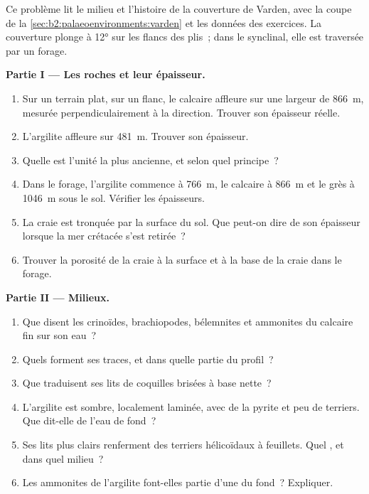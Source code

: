 \begin{problem}\label{pb:b2:palaeoenvironments:1}
Ce problème lit le milieu et l'histoire de la couverture de Varden, avec la coupe de la
\cref{sec:b2:palaeoenvironments:varden} et les données des exercices. La couverture plonge
à \ang{12} sur les flancs des plis~; dans le synclinal, elle est traversée par un forage.

\medskip\noindent\textbf{Partie I --- Les roches et leur épaisseur.}
\begin{enumerate}
\item Sur un terrain plat, sur un flanc, le calcaire affleure sur une largeur de
\qty{866}{m}, mesurée perpendiculairement à la direction. Trouver son épaisseur réelle.
\item L'argilite affleure sur \qty{481}{m}. Trouver son épaisseur.
\item Quelle est l'unité la plus ancienne, et selon quel principe~?
\item Dans le forage, l'argilite commence à \qty{766}{m}, le calcaire
à \qty{866}{m} et le grès à \qty{1046}{m} sous le sol. Vérifier les épaisseurs.
\item La craie est tronquée par la surface du sol. Que peut-on
dire de son épaisseur lorsque la mer crétacée s'est retirée~?
\item Trouver la porosité de la craie à la surface et à la base de la craie dans le forage.
\end{enumerate}

\medskip\noindent\textbf{Partie II --- Milieux.}
\begin{enumerate}[resume]
\item Que disent les crinoïdes, brachiopodes,
bélemnites et ammonites du calcaire fin sur son eau~?
\item Quels  forment ses traces, et dans quelle partie du profil~?
\item Que traduisent ses lits de coquilles brisées à base nette~?
\item L'argilite est sombre, localement laminée, avec
de la pyrite et peu de terriers. Que dit-elle de l'eau de fond~?
\item Ses lits plus clairs renferment des terriers hélicoïdaux à feuillets. Quel , et dans quel milieu~?
\item Les ammonites de l'argilite font-elles partie d'une  du fond~? Expliquer.
\end{enumerate}


\end{problem}
